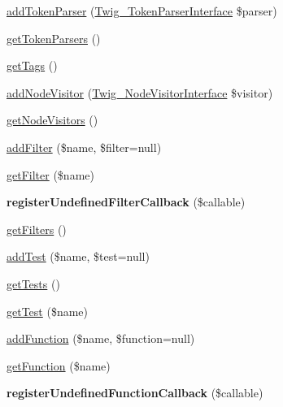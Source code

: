 \begin{DoxyCompactItemize}
\item 
\hyperlink{class_twig___environment_a8f805d29eac2b8ce1da513e9390952f3}{add\+Token\+Parser} (\hyperlink{interface_twig___token_parser_interface}{Twig\+\_\+\+Token\+Parser\+Interface} \$parser)
\item 
\hyperlink{class_twig___environment_a8fd35903c3d01c0f0078f59d142eb063}{get\+Token\+Parsers} ()
\item 
\hyperlink{class_twig___environment_ae07173ab06a20e2f5bd928cc0518e01f}{get\+Tags} ()
\item 
\hyperlink{class_twig___environment_adc294d7c409f47d2c26847601897c6db}{add\+Node\+Visitor} (\hyperlink{interface_twig___node_visitor_interface}{Twig\+\_\+\+Node\+Visitor\+Interface} \$visitor)
\item 
\hyperlink{class_twig___environment_aec02093179d390d22ae4083f23a1d74a}{get\+Node\+Visitors} ()
\item 
\hyperlink{class_twig___environment_a07b5aed0599bf6b5a959138a50c20934}{add\+Filter} (\$name, \$filter=null)
\item 
\hyperlink{class_twig___environment_a4a7bab9eccf45585b757bc4637d49c51}{get\+Filter} (\$name)
\item 
{\bfseries register\+Undefined\+Filter\+Callback} (\$callable)\hypertarget{class_twig___environment_a34e0732405a6c7994b333ce2f8a1deb0}{}\label{class_twig___environment_a34e0732405a6c7994b333ce2f8a1deb0}

\item 
\hyperlink{class_twig___environment_a428d91319fc73d3038784cf5436936b6}{get\+Filters} ()
\item 
\hyperlink{class_twig___environment_abffdc04383a36adfedf9e01be73eb577}{add\+Test} (\$name, \$test=null)
\item 
\hyperlink{class_twig___environment_a7e247dd31cc8d37a6c97353a062a0080}{get\+Tests} ()
\item 
\hyperlink{class_twig___environment_a981e961a31852f7ad5ff8176a886208c}{get\+Test} (\$name)
\item 
\hyperlink{class_twig___environment_a6e2559ac470ee7534cd0c717c74fb1d4}{add\+Function} (\$name, \$function=null)
\item 
\hyperlink{class_twig___environment_ae4433c0b7cff67452143bc6abd237330}{get\+Function} (\$name)
\item 
{\bfseries register\+Undefined\+Function\+Callback} (\$callable)\hypertarget{class_twig___environment_a64b35a5fbb8691099c5fcdb36e763779}{}\label{class_twig___environment_a64b35a5fbb8691099c5fcdb36e763779}


\end{DoxyCompactItemize}
